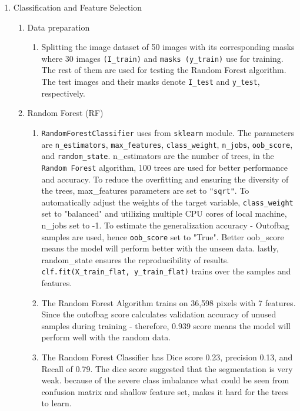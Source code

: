 \documentclass[
    a4paper,
    12pt,
    parskip=half,
]{scrarticle}
\begin{document}
\begin{enumerate}
    \item Classification and Feature Selection
    \begin{enumerate}[label=\theenumi.\arabic*.]
        \item Data preparation
        \begin{enumerate}[label=\alph*)]
            \item Splitting the image dataset of 50 images with its corresponding masks where 30 images \texttt{(I\_train)}  and \texttt{masks (y\_train)} use for training. The rest of them are used for testing the Random Forest algorithm. The test images and their masks denote \texttt{I\_test} and \texttt{y\_test}, respectively.
        \end{enumerate}
        \item Random Forest (RF)
        \begin{enumerate}[label=\alph*)]
            \item \texttt{RandomForestClassifier} uses from \texttt{sklearn} module. The parameters are \texttt{n\_estimators}, \texttt{max\_features}, \texttt{class\_weight}, \texttt{n\_jobs}, \texttt{oob\_score}, and \texttt{random\_state}. n\_estimators are the number of trees, in the \texttt{Random Forest} algorithm, 100 trees are used for better performance and accuracy.
            To reduce the overfitting and ensuring the diversity of the trees, max\_features parameters are set to \texttt{"sqrt"}. To automatically adjust the weights of the target variable, \texttt{class\_weight} set to "balanced" and utilizing multiple CPU cores of local machine, n\_jobs set to -1. To estimate the generalization accuracy - Out\-of\-bag samples are used, hence \texttt{oob\_score} set to "True". Better oob\_score means the model will perform better with the unseen data. lastly, random\_state ensures the reproducibility of results. \texttt{clf.fit(X\_train\_flat, y\_train\_flat)} trains over the samples and features. 
            \item The Random Forest Algorithm trains on 36,598 pixels with 7 features. Since the out\-of\-bag score calculates validation accuracy of unused samples during training - therefore, 0.939 score means the model will perform well with the random data.
            \item The Random Forest Classifier has Dice score 0.23, precision 0.13, and Recall of 0.79. The dice score suggested that the segmentation is very weak. because of the severe class imbalance what could be seen from confusion matrix and shallow feature set, makes it hard for the trees to learn.  
        \end{enumerate}
        

\end{enumerate}
\end{enumerate}
\end{document}
